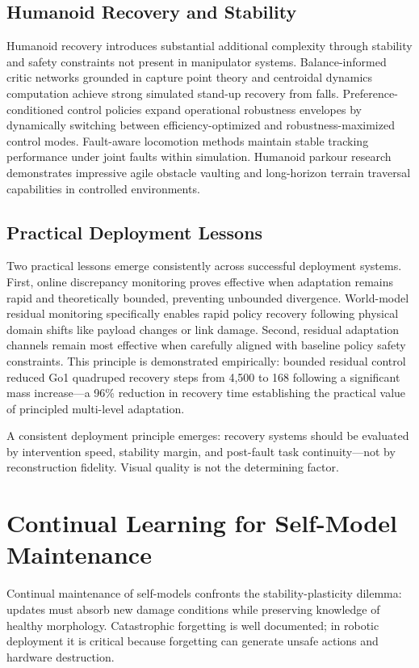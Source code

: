 \documentclass[12pt,a4paper,oneside]{report}
\begin{document}
\subsection{Humanoid Recovery and Stability}

Humanoid recovery introduces substantial additional complexity through stability and safety constraints not present in manipulator systems. Balance-informed critic networks grounded in capture point theory and centroidal dynamics computation achieve strong simulated stand-up recovery from falls. Preference-conditioned control policies expand operational robustness envelopes by dynamically switching between efficiency-optimized and robustness-maximized control modes. Fault-aware locomotion methods maintain stable tracking performance under joint faults within simulation. Humanoid parkour research demonstrates impressive agile obstacle vaulting and long-horizon terrain traversal capabilities in controlled environments.

\subsection{Practical Deployment Lessons}

Two practical lessons emerge consistently across successful deployment systems. First, online discrepancy monitoring proves effective when adaptation remains rapid and theoretically bounded, preventing unbounded divergence. World-model residual monitoring specifically enables rapid policy recovery following physical domain shifts like payload changes or link damage. Second, residual adaptation channels remain most effective when carefully aligned with baseline policy safety constraints. This principle is demonstrated empirically: bounded residual control reduced Go1 quadruped recovery steps from 4,500 to 168 following a significant mass increase---a 96\% reduction in recovery time establishing the practical value of principled multi-level adaptation.

A consistent deployment principle emerges: recovery systems should be evaluated by intervention speed, stability margin, and post-fault task continuity---not by reconstruction fidelity. Visual quality is not the determining factor.

\section{Continual Learning for Self-Model Maintenance}

Continual maintenance of self-models confronts the stability-plasticity dilemma: updates must absorb new damage conditions while preserving knowledge of healthy morphology. Catastrophic forgetting is well documented; in robotic deployment it is critical because forgetting can generate unsafe actions and hardware destruction.
\end{document}
